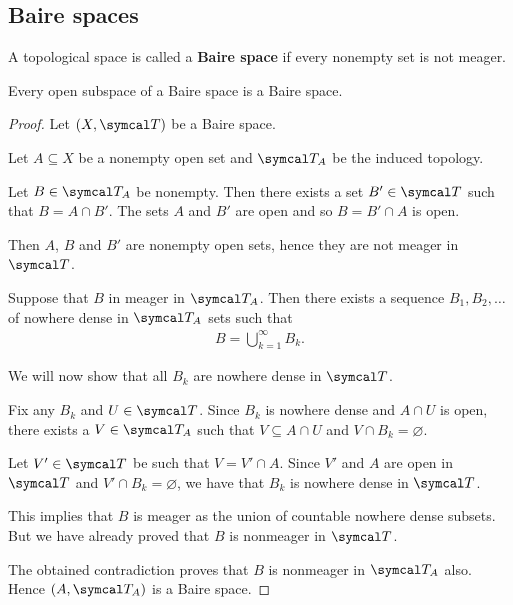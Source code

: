 \subsection{Baire spaces}\label{sec:baire_spaces}

\begin{definition}\label{def:baire_space}
  A topological space is called a \textbf{Baire space} if every nonempty set is not meager.
\end{definition}

\begin{proposition}\label{thm:open_subspace_of_baire_space_is_baire}
  Every open subspace of a Baire space is a Baire space.
\end{proposition}
\begin{proof}
  Let \( (X, \Cal{T}) \) be a Baire space.

  Let \( A \subseteq X \) be a nonempty open set and \( \Cal{T}_A \) be the induced topology.

  Let \( B \in \Cal{T}_A \) be nonempty. Then there exists a set \( B' \in \Cal{T} \) such that \( B = A \cap B' \). The sets \( A \) and \( B' \) are open and so \( B = B' \cap A \) is open.

  Then \( A \), \( B \) and \( B' \) are nonempty open sets, hence they are not meager in \( \Cal{T} \).

  Suppose that \( B \) in meager in \( \Cal{T}_A \). Then there exists a sequence \( B_1, B_2, \ldots \) of nowhere dense in \( \Cal{T}_A \) sets such that
  \begin{align*}
    B = \bigcup_{k=1}^\infty B_k.
  \end{align*}

  We will now show that all \( B_k \) are nowhere dense in \( \Cal{T} \).

  Fix any \( B_k \) and \( U \in \Cal{T} \). Since \( B_k \) is nowhere dense and \( A \cap U \) is open, there exists a \( V \in \Cal{T}_A \) such that \( V \subseteq A \cap U \) and \( V \cap B_k = \varnothing \).

  Let \( V' \in \Cal{T} \) be such that \( V = V' \cap A \). Since \( V' \) and \( A \) are open in \( \Cal{T} \) and \( V' \cap B_k = \varnothing \), we have that \( B_k \) is nowhere dense in \( \Cal{T} \).

  This implies that \( B \) is meager as the union of countable nowhere dense subsets. But we have already proved that \( B \) is nonmeager in \( \Cal{T} \).

  The obtained contradiction proves that \( B \) is nonmeager in \( \Cal{T}_A \) also. Hence \( (A, \Cal{T}_A) \) is a Baire space.
\end{proof}
